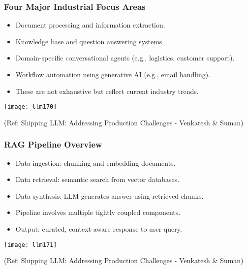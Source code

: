 \begin{frame}[fragile]\frametitle{Four Major Industrial Focus Areas}
  \begin{itemize}
    \item Document processing and information extraction.
    \item Knowledge base and question answering systems.
    \item Domain-specific conversational agents (e.g., logistics, customer support).
    \item Workflow automation using generative AI (e.g., email handling).
    \item These are not exhaustive but reflect current industry trends.
  \end{itemize}
  
	\begin{center}
	\texttt{[image: llm170]}
	
	{\tiny (Ref: Shipping LLM: Addressing Production Challenges - Venkatesh \& Suman)}
	\end{center}
  
\end{frame}

\begin{frame}[fragile]\frametitle{RAG Pipeline Overview}
  \begin{itemize}
    \item Data ingestion: chunking and embedding documents.
    \item Data retrieval: semantic search from vector databases.
    \item Data synthesis: LLM generates answer using retrieved chunks.
    \item Pipeline involves multiple tightly coupled components.
    \item Output: curated, context-aware response to user query.
  \end{itemize}
  
	\begin{center}
	\texttt{[image: llm171]}
	
	{\tiny (Ref: Shipping LLM: Addressing Production Challenges - Venkatesh \& Suman)}
	\end{center}  
\end{frame}


